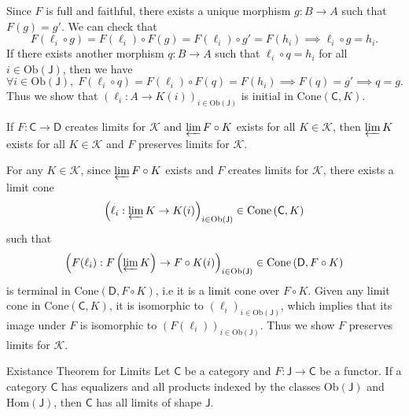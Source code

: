\begin{prf}
    Since $F$ is full and faithful, there exists a unique morphism $g:B\to A$ such that $F(g)=g'$. We can check that  
    \[
        F\left(\ell_i \circ g\right)=F\left(\ell_i \right)\circ F\left( g\right)=F\left(\ell_i \right)\circ g'=F\left(h_i\right)\implies \ell_i \circ g=h_i.
    \]
    If there exists another morphism $q:B\to A$ such that $\ell_i \circ q=h_i$ for all $i\in\mathrm{Ob}\left(\mathsf{J}\right)$, then we have
    \[
    \forall i \in\mathrm{Ob}\left(\mathsf{J}\right),\;F\left( \ell_i \circ q\right)=F\left(\ell_i \right)\circ F\left( q\right)=F\left(h_i\right)\implies F\left( q\right)=g'\implies q=g.
    \]
    Thus we show that $\left(\ell_i:A\to K(i)\right)_{i\in \mathrm{Ob}(\mathsf{J})}$ is initial in $\mathrm{Cone}\left(\mathsf{C},K\right)$.
\end{prf}


\begin{proposition}{}{}
    If $F:\mathsf{C}\to \mathsf{D}$ creates limits for $\mathcal{K}$ and $\varprojlim F\circ K$ exists for all $K\in\mathcal{K}$, then $\varprojlim K$ exists for all $K\in\mathcal{K}$ and $F$ preserves limits for $\mathcal{K}$.
\end{proposition}

\begin{prf}
    For any $K\in\mathcal{K}$, since $\varprojlim F\circ K$ exists and $F$ creates limits for $\mathcal{K}$, there exists a limit cone 
    \[
       \left(\ell_i:\varprojlim K\to K(i)\right)_{i\in \mathrm{Ob}(\mathsf{J})}\in\mathrm{Cone}\left(\mathsf{C},K\right)    
    \]
    such that
    \[
        \left(F(\ell_i):F\left(\varprojlim K\right)\to F\circ K(i)\right)_{i\in \mathrm{Ob}(\mathsf{J})}\in \mathrm{Cone}\left(\mathsf{D},F\circ K\right)
    \]
    is terminal in $\mathrm{Cone}\left(\mathsf{D},F\circ K\right)$, i.e it is a limit cone over $F\circ K$. Given any limit cone in $\mathrm{Cone}\left(\mathsf{C},K\right) $, it is isomorphic to $\left(\ell_i\right)_{i\in \mathrm{Ob}(\mathsf{J})}$, which implies that its image under $F$ is isomorphic to $\left(F(\ell_i)\right)_{i\in \mathrm{Ob}(\mathsf{J})}$. Thus we show $F$ preserves limits for $\mathcal{K}$.
\end{prf}


\begin{theorem}{Existance Theorem for Limits}{}
    Let $\mathsf{C}$ be a category and $F:\mathsf{J}\to\mathsf{C}$ be a functor. If a category $\mathsf{C}$ has equalizers and all products indexed by the classes $\mathrm{Ob}(\mathsf{J})$ and $\mathrm{Hom}(\mathsf{J})$, then $\mathsf{C}$ has all limits of shape $\mathsf{J}$.
\end{theorem}


